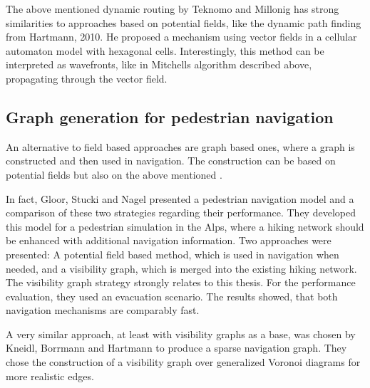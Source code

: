 		The above mentioned dynamic routing by Teknomo and Millonig has strong similarities to approaches based on potential fields, like the dynamic path finding from Hartmann, 2010\cite{hartmann-geodesic}.
		He proposed a mechanism using vector fields in a cellular automaton model with hexagonal cells.
		Interestingly, this method can be interpreted as wavefronts, like in Mitchells algorithm described above, propagating through the vector field\cite[4]{hartmann-geodesic}.
			
	
	\subsection{Graph generation for pedestrian navigation}
	
		An alternative to field based approaches are graph based ones, where a graph is constructed and then used in navigation.
		The construction can be based on potential fields but also on the above mentioned .
		
		In fact, Gloor, Stucki and Nagel presented a pedestrian navigation model and a comparison of these two strategies regarding their performance\cite{gloor-hybrid-pedestrian-routing}.
		They developed this model for a pedestrian simulation in the Alps, where a hiking network should be enhanced with additional navigation information.
		Two approaches were presented: A potential field based method, which is used in navigation when needed, and a visibility graph, which is merged into the existing hiking network.
		The visibility graph strategy strongly relates to this thesis.
		For the performance evaluation, they used an evacuation scenario.
		The results showed, that both navigation mechanisms are comparably fast.
		
		A very similar approach, at least with visibility graphs as a base, was chosen by Kneidl, Borrmann and Hartmann to produce a sparse navigation graph\cite[5]{kneidl-borrmann-hartmann-navigation}.
		They chose the construction of a visibility graph over generalized Voronoi diagrams for more realistic edges.